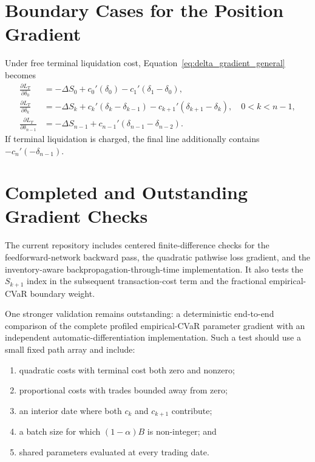 \section{Boundary Cases for the Position Gradient}

Under free terminal liquidation cost, Equation~\eqref{eq:delta_gradient_general}
becomes
\begin{align*}
  \frac{\partial L_T}{\partial\delta_0}
  &=-\Delta S_0+c_0'(\delta_0)-c_1'(\delta_1-\delta_0),\\
  \frac{\partial L_T}{\partial\delta_k}
  &=-\Delta S_k+c_k'(\delta_k-\delta_{k-1})
    -c_{k+1}'(\delta_{k+1}-\delta_k),
  \quad 0<k<n-1,\\
  \frac{\partial L_T}{\partial\delta_{n-1}}
  &=-\Delta S_{n-1}
    +c_{n-1}'(\delta_{n-1}-\delta_{n-2}).
\end{align*}
If terminal liquidation is charged, the final line additionally contains
$-c_n'(-\delta_{n-1})$.

\section{Completed and Outstanding Gradient Checks}

The current repository includes centered finite-difference checks for the
feedforward-network backward pass, the quadratic pathwise loss gradient, and
the inventory-aware backpropagation-through-time implementation. It also tests
the $S_{k+1}$ index in the subsequent transaction-cost term and the fractional
empirical-CVaR boundary weight.

One stronger validation remains outstanding: a deterministic end-to-end
comparison of the complete profiled empirical-CVaR parameter gradient with an
independent automatic-differentiation implementation. Such a test should use a
small fixed path array and include:

\begin{enumerate}[leftmargin=2em]
  \item quadratic costs with terminal cost both zero and nonzero;
  \item proportional costs with trades bounded away from zero;
  \item an interior date where both $c_k$ and $c_{k+1}$ contribute;
  \item a batch size for which $(1-\alpha)B$ is non-integer; and
  \item shared parameters evaluated at every trading date.
\end{enumerate}

